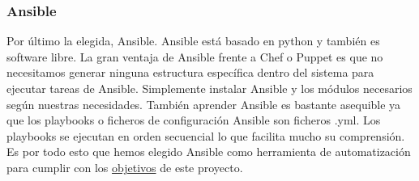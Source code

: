 		\subsubsection{Ansible}
			\begin{text}
				Por último la elegida, Ansible. Ansible está basado en python y también es software libre. La gran ventaja de Ansible frente a Chef o Puppet es que no necesitamos generar ninguna estructura específica dentro del sistema para ejecutar tareas de Ansible. Simplemente instalar Ansible y los módulos necesarios según nuestras necesidades. También aprender Ansible es bastante asequible ya que los playbooks o ficheros de configuración Ansible son ficheros .yml. Los playbooks se ejecutan en orden secuencial lo que facilita mucho su comprensión. Es por todo esto que hemos elegido Ansible \cite{ansible:online} como herramienta de automatización para cumplir con los \hyperref[objetivos_primarios]{objetivos} de este proyecto. 
			\end{text}
		